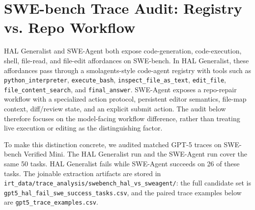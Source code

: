 \section{SWE-bench Trace Audit: Registry vs. Repo Workflow}
\label{app:swebench-trace-audit}

HAL Generalist and SWE-Agent both expose code-generation, code-execution,
shell, file-read, and file-edit affordances on SWE-bench. In HAL Generalist,
these affordances pass through a smolagents-style code-agent registry with
tools such as \texttt{python\_interpreter}, \texttt{execute\_bash},
\texttt{inspect\_file\_as\_text}, \texttt{edit\_file},
\texttt{file\_content\_search}, and \texttt{final\_answer}. SWE-Agent exposes
a repo-repair workflow with a specialized action protocol, persistent editor
semantics, file-map context, diff/review state, and an explicit submit action.
The audit below therefore focuses on the model-facing workflow difference,
rather than treating live execution or editing as the distinguishing factor.

To make this distinction concrete, we audited matched GPT-5 traces on
SWE-bench Verified Mini. The HAL Generalist run
\texttt{}
and the SWE-Agent run
\texttt{}
cover the same 50 tasks. HAL Generalist fails while SWE-Agent succeeds on 26
of these tasks. The joinable extraction artifacts are stored in
\texttt{irt\_data/trace\_analysis/swebench\_hal\_vs\_sweagent/}: the full
candidate set is \texttt{gpt5\_hal\_fail\_swe\_success\_tasks.csv}, and the
paired trace examples below are \texttt{gpt5\_trace\_examples.csv}.

